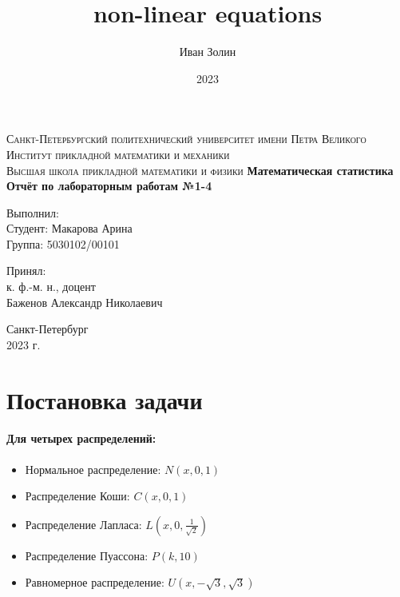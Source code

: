 \documentclass[a4paper,14pt]{article}
\title{non-linear equations}
\author{Иван Золин}
\date{2023}
\begin{document}
	
	\begin{titlepage}
		\begin{center}
			\textsc{
				Санкт-Петербургский политехнический университет имени Петра Великого \\[5mm]
				Институт прикладной математики и механики\\[2mm]
				Высшая школа прикладной математики и физики            
			}   
			\vfill
			\textbf{\large
				Математическая статистика\\
				Отчёт по лабораторным работам №1-4 \\[3mm]
			}                
		\end{center}
		
		\vfill
		\hfill
		\begin{minipage}{0.5\textwidth}
			Выполнил: \\[2mm]   
			Студент: Макарова Арина \\
			Группа: 5030102/00101\\
		\end{minipage}
		
		\hfill
		\begin{minipage}{0.5\textwidth}
			Принял: \\[2mm]
			к. ф.-м. н., доцент \\   
			Баженов Александр Николаевич
		\end{minipage}
		
		\vfill
		\begin{center}
			Санкт-Петербург \\2023 г.
		\end{center}
	\end{titlepage}
	
	\tableofcontents
	\newpage
	\listoffigures
	\newpage
	\listoftables
	\newpage
	
	\section{Постановка задачи}
	\paragraph{Для четырех распределений:}
	\begin{itemize}
		\item Нормальное распределение: $N(x, 0, 1)$
		\item Распределение Коши: $C(x, 0, 1)$
		\item Распределение Лапласа: $L(x, 0, \frac{1}{\sqrt{2}})$
		\item Распределение Пуассона: $P(k, 10)$
		\item Равномерное распределение: $U(x, -\sqrt{3}, \sqrt{3})$
	\end{itemize}
\end{document}
